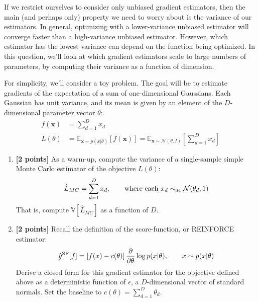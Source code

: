 \documentclass{harvardml}
\def\simiid{\sim_{\mbox{\tiny iid}}}
\newcommand{\bx}{\mathbf{x}}
\newcommand{\distNorm}{\mathcal{N}}
\newcommand{\var}{\mathbb{V}}
\newcommand{\E}{\mathbb{E}}
\newcommand{\PT}{\frac{\partial}{\partial \theta}}
\theoremstyle{plain}
\begin{document}







\begin{problem}

If we restrict ourselves to consider only unbiased gradient estimators, then the main (and perhaps only) property we need to worry about is the variance of our estimators.
In general, optimizing with a lower-variance unbiased estimator will converge faster than a high-variance unbiased estimator.
However, which estimator has the lowest variance can depend on the function being optimized.
In this question, we'll look at which gradient estimators scale to large numbers of parameters, by computing their variance as a function of dimension.

For simplicity, we'll consider a toy problem.
The goal will be to estimate gradients of the expectation of a sum of one-dimensional Gaussians.
Each Gaussian has unit variance, and its mean is given by an element of the $D$-dimensional parameter vector $\theta$:
%
\begin{align}
f(\bx) & = \sum_{d=1}^D x_d \\
L(\theta) & = \E_{\bx \sim p(x|\theta)} \left[ f(\bx) \right]
= \E_{\bx \sim \distNorm(\theta, I)} \left[ \sum_{d=1}^D x_d \right]
\end{align}



\begin{enumerate}[label=(\alph*)]
\item {\bf [2 points]} As a warm-up, compute the variance of a single-sample simple Monte Carlo estimator of the objective $L(\theta)$:
%
\begin{align}
\hat L_{MC} 
= \sum_{d=1}^D x_d, \qquad \textnormal{where each } x_d \simiid \distNorm(\theta_d, 1)
\end{align}
%
That is, compute $\var \left[ \hat L_{MC} \right]$ as a function of $D$.

\item {\bf [2 points]}
Recall the definition of the score-function, or REINFORCE estimator:
%
\begin{align}
\hat g^\textnormal{SF}[f] = \left[f(x) - c(\theta) \right] \PT \log p(x | \theta), \qquad x \sim p(x | \theta)
\end{align}
%
Derive a closed form for this gradient estimator for the objective defined above as a deterministic function of $\epsilon$, a $D$-dimensional vector of standard normals.
Set the baseline to $c(\theta) = \sum_{d=1}^D \theta_d$.


\end{enumerate}
\end{problem}
\end{document}
